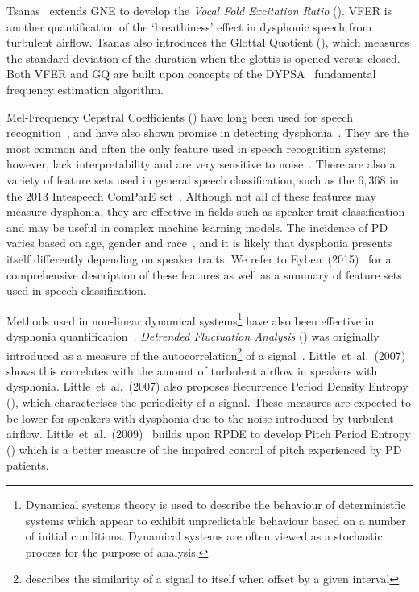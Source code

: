 \documentclass[12pt, twoside]{book}
\renewcommand\emph[1]{\textit{\color{USred}{#1}}}
\begin{document}
Tsanas~\cite{spoverview} extends GNE to develop the \textit{Vocal Fold Excitation Ratio} (\emph{VFER}). VFER is another quantification of the `breathiness' effect in dysphonic speech from turbulent airflow. Tsanas also introduces the Glottal Quotient (\emph{GQ}), which measures the standard deviation of the duration when the glottis is opened versus closed. Both VFER and GQ are built upon concepts of the DYPSA~\cite{dypsa} fundamental frequency estimation algorithm. 

Mel-Frequency Cepstral Coefficients (\emph{MFCC}) have long been used for speech recognition~\cite{mfcc}, and have also shown promise in detecting dysphonia~\cite{mfccml}. They are the most common and often the only feature used in speech recognition systems; however, lack interpretability and are very sensitive to noise~\cite{mfccrobust}. There are also a variety of feature sets used in general speech classification, such as the $6,368$ in the 2013 Intespeech ComParE set~\cite{is2013}. Although not all of these features may measure dysphonia, they are effective in fields such as speaker trait classification and may be useful in complex machine learning models. The incidence of PD varies based on age, gender and race~\cite{ageracial,racial}, and it is likely that dysphonia presents itself differently depending on speaker traits. We refer to Eyben~(2015)~\cite{ostextbook} for a comprehensive description of these features as well as a summary of feature sets used in speech classification.


\label{dfadescription}
Methods used in non-linear dynamical systems\footnote{Dynamical systems theory is used to describe the behaviour of deterministfic systems which appear to exhibit unpredictable behaviour based on a number of initial conditions. Dynamical systems are often viewed as a stochastic process for the purpose of analysis.} have also been effective in dysphonia quantification~\cite{splittlenonlinear2007}. \textit{Detrended Fluctuation Analysis} (\emph{DFA}) was originally introduced as a measure of the autocorrelation\footnote{\emph{Autocorrelation} describes the similarity of a signal to itself when offset by a given interval} of a signal~\cite{dfa}. Little~et~al.~(2007)~\cite{splittlenonlinear2007} shows this correlates with the amount of turbulent airflow in speakers with dysphonia. Little~et~al.~(2007) also proposes Recurrence Period Density Entropy (\emph{RPDE}), which characterises the periodicity of a signal. These measures are expected to be lower for speakers with dysphonia due to the noise introduced by turbulent airflow. Little~et~al.~(2009)~\cite{splittledysphonia2009} builds upon RPDE to develop Pitch Period Entropy (\emph{PPE}) which is a better measure of the impaired control of pitch experienced by PD patients.
\end{document}
